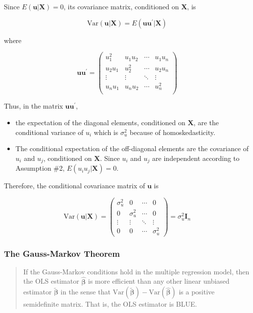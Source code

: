 \documentclass[a4paper,11pt]{article}
\newcommand{\var}{\mathrm{Var}}
\begin{document}
\begin{itemize}
Since \(E(\mathbf{u} | \mathbf{X}) = 0\), its covariance matrix,
conditioned on \(\mathbf{X}\), is
\begin{LaTeX}
\[ \var(\mathbf{u} | \mathbf{X}) = E(\mathbf{u} \mathbf{u}^{\prime} | \mathbf{X})
  \]
\end{LaTeX}
where
\begin{LaTeX}
\begin{equation*}
\mathbf{u} \mathbf{u}^{\prime} =
\begin{pmatrix}
u_1^2 & u_1 u_2 & \cdots &u_1 u_n \\
u_2 u_1 & u_2^2 & \cdots & u_2 u_n \\
\vdots & \vdots & \ddots & \vdots \\
u_n u_1 & u_n u_2 & \cdots & u_n^2 \\
\end{pmatrix}
\end{equation*}
\end{LaTeX}
Thus, in the matrix \(\mathbf{u} \mathbf{u}^{\prime}\),
\begin{itemize}
\item the expectation of the diagonal elements, conditioned on \(\mathbf{X}\),
are the conditional variance of \(u_i\) which is \(\sigma^2_u\) because
of homoskedasticity.
\item The conditional expectation of the off-diagonal elements are the
covariance of \(u_i\) and \(u_j\), conditioned on \(\mathbf{X}\). Since
\(u_i\) and \(u_j\) are independent according to Assumption \#2, \(E(u_i
    u_j | \mathbf{X}) = 0\).
\end{itemize}
Therefore, the conditional covariance matrix of \(\mathbf{u}\) is
\begin{LaTeX}
\begin{equation*}
\var(\mathbf{u} | \mathbf{X}) =
\begin{pmatrix}
\sigma^2_u & 0 & \cdots & 0 \\
0 & \sigma^2_u & \cdots & 0 \\
\vdots & \vdots & \ddots & \vdots \\
0 & 0 & \cdots & \sigma^2_u
\end{pmatrix}
= \sigma^2_u \mathbf{I}_n
\end{equation*}
\end{LaTeX}
\end{itemize}

\subsubsection*{The Gauss-Markov Theorem}
\label{sec:org40c8fbc}
\begin{quote}
If the Gauss-Markov conditions hold in the multiple regression model,
then the OLS estimator \(\hat{\boldsymbol{\beta}}\) is more efficient
than any other linear unbiased estimator \(\tilde{\boldsymbol{\beta}}\)
in the sense that \(\var(\tilde{\boldsymbol{\beta}}) -
\var(\hat{\boldsymbol{\beta}})\) is a positive semidefinite
matrix. That is, the OLS estimator is BLUE.
\end{quote}
\end{document}
